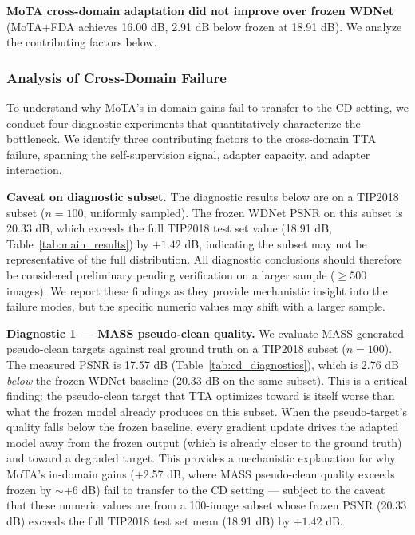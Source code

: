 \documentclass[review,10pt]{elsarticle}
\begin{document}
\textbf{MoTA cross-domain adaptation did not improve over frozen WDNet} (MoTA+FDA achieves 16.00 dB, 2.91 dB below frozen at 18.91 dB). We analyze the contributing factors below.

\subsubsection{Analysis of Cross-Domain Failure}
\label{sec:cd_failure}

To understand why MoTA's in-domain gains fail to transfer to the CD setting, we conduct four diagnostic experiments that quantitatively characterize the bottleneck. We identify three contributing factors to the cross-domain TTA failure, spanning the self-supervision signal, adapter capacity, and adapter interaction.

\noindent\textbf{Caveat on diagnostic subset.} The diagnostic results below are on a TIP2018 subset ($n=100$, uniformly sampled). The frozen WDNet PSNR on this subset is 20.33 dB, which exceeds the full TIP2018 test set value (18.91 dB, Table~\ref{tab:main_results}) by $+1.42$ dB, indicating the subset may not be representative of the full distribution. All diagnostic conclusions should therefore be considered preliminary pending verification on a larger sample ($\ge 500$ images). We report these findings as they provide mechanistic insight into the failure modes, but the specific numeric values may shift with a larger sample.

\smallskip
\noindent\textbf{Diagnostic 1 --- MASS pseudo-clean quality.} We evaluate MASS-generated pseudo-clean targets against real ground truth on a TIP2018 subset ($n=100$). The measured PSNR is 17.57 dB (Table~\ref{tab:cd_diagnostics}), which is 2.76 dB \textit{below} the frozen WDNet baseline (20.33 dB on the same subset). This is a critical finding: the pseudo-clean target that TTA optimizes toward is itself worse than what the frozen model already produces on this subset. When the pseudo-target's quality falls below the frozen baseline, every gradient update drives the adapted model away from the frozen output (which is already closer to the ground truth) and toward a degraded target. This provides a mechanistic explanation for why MoTA's in-domain gains (+2.57 dB, where MASS pseudo-clean quality exceeds frozen by $\sim$+6 dB) fail to transfer to the CD setting --- subject to the caveat that these numeric values are from a 100-image subset whose frozen PSNR (20.33 dB) exceeds the full TIP2018 test set mean (18.91 dB) by $+1.42$ dB.
\end{document}
